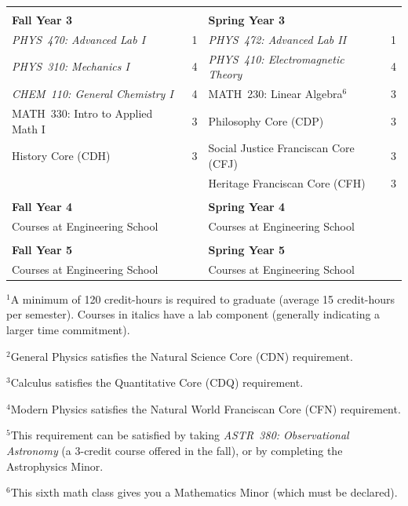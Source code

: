 \documentclass[12pt]{article}
\begin{document}
\begin{table}[h!]
\begin{center}
{\begin{tabular*}{0.9\textwidth}{@{\extracolsep{\fill}}lclc}
 & \\
{\Large \textbf{Fall Year 3}} & & {\Large \textbf{Spring Year 3}} & \\
\hline
{\em PHYS~470: Advanced Lab I} & 1 & {\em PHYS~472: Advanced Lab II}  & 1 \\
{\em PHYS~310: Mechanics I}         & 4 & {\em PHYS~410: Electromagnetic Theory}  & 4 \\
{\em CHEM~110: General Chemistry I} & 4 & MATH~230: Linear Algebra$^{6}$    & 3 \\
MATH~330: Intro to Applied Math I   & 3 & Philosophy Core (CDP)             & 3 \\
History Core (CDH)                  & 3 & Social Justice Franciscan Core (CFJ) & 3 \\
                                    &   & Heritage Franciscan Core (CFH) & 3 \\
 & \\
{\Large \textbf{Fall Year 4}} & & {\Large \textbf{Spring Year 4}} & \\
\hline
Courses at Engineering School  &   & Courses at Engineering School &  \\
 & \\
{\Large \textbf{Fall Year 5}} & & {\Large \textbf{Spring Year 5}} & \\
\hline
Courses at Engineering School  &   & Courses at Engineering School &  \\
\end{tabular*}
}
\end{center}
\end{table}

\vspace*{-4mm}
\hspace{0.1in}$^{1}$A minimum of 120 credit-hours is required to
graduate (average 15 credit-hours per semester).  \hspace*{0.42in}Courses in italics have a lab
component (generally indicating a larger time commitment). 

\hspace{0.1in}$^{2}$General Physics satisfies the Natural Science Core (CDN) requirement.

\hspace{0.1in}$^{3}$Calculus satisfies the Quantitative Core (CDQ) requirement.

\hspace{0.1in}$^{4}$Modern Physics satisfies the Natural World Franciscan Core
(CFN) requirement.

\hspace{0.1in}$^{5}$This requirement can be satisfied by taking {\em ASTR~380:
  Observational Astronomy} (a 3-credit \hspace*{0.42in}course offered in the
fall), or by completing the Astrophysics Minor.

\hspace{0.1in}$^{6}$This sixth math class gives you a Mathematics Minor (which
must be declared).
\end{document}
